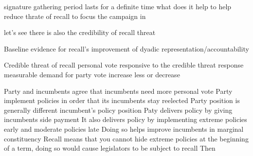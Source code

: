 \documentclass[hyphens, crop=false]{standalone}
\begin{document}
	
	signature gathering period lasts for a definite time
	what does it help
	to help reduce thrate of recall
	to focus the campaign in 
	
	let's see there is also the credibility of recall threat
	
	Baseline evidence for recall's improvement of dyadic representation/accountability
	
	Credible threat of recall
	personal vote responsive to the credible threat
	response measurable
	demand for party vote increase less or decrease
	
	Party and incumbents agree that incumbents need more personal vote
	Party implement policies in order that its incumbents stay reelected
	Party position is generally different incumbent's policy position
	Paty delivers policy by giving incumbents side payment
	It also delivers policy by implementing extreme policies early and moderate policies late
	Doing so helps improve incumbents in marginal constituency
	Recall means that you cannot hide extreme policies at the beginning of a term,
	doing so would cause legislators to be subject to recall
	Then 
	
	
	
	
	
\end{document}
